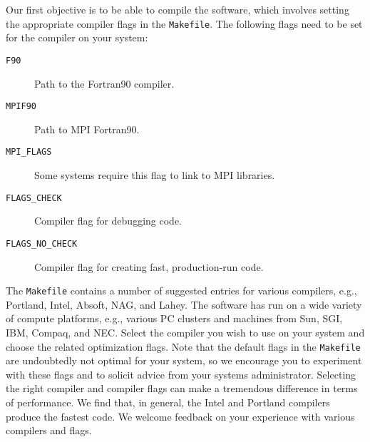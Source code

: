\documentclass[onecolumn]{article}
\begin{document}
Our first objective is to be able to compile the software, which involves
setting the appropriate compiler flags in the \texttt{Makefile}.
The following flags need to be set for the compiler on your system:
\begin{description}
\item[\texttt{F90}] Path to the Fortran90 compiler.
\item[\texttt{MPIF90}] Path to MPI Fortran90.
\item[\texttt{MPI\_FLAGS}] Some systems require this flag to link to MPI libraries.
\item[\texttt{FLAGS\_CHECK}] Compiler flag for debugging code.
\item[\texttt{FLAGS\_NO\_CHECK}] Compiler flag for creating fast,
production-run code.
\end{description}
The \texttt{Makefile} contains a number of suggested entries for various compilers,
e.g., Portland, Intel, Absoft, NAG, and Lahey.
The software has run on a
wide variety of compute platforms, e.g., various PC clusters and machines from
Sun, SGI, IBM, Compaq, and NEC.
Select the compiler you wish to use on your system and choose the
related optimization flags. Note that the default flags in the
\texttt{Makefile} are undoubtedly not optimal for your system, so we
encourage you to experiment with these flags and to solicit advice from
your systems administrator. Selecting the right compiler
and compiler flags can make a tremendous
difference in terms of performance.
We find that, in general, the Intel and Portland
compilers produce the fastest code.
We welcome feedback on your experience with various compilers and flags.
\end{document}
